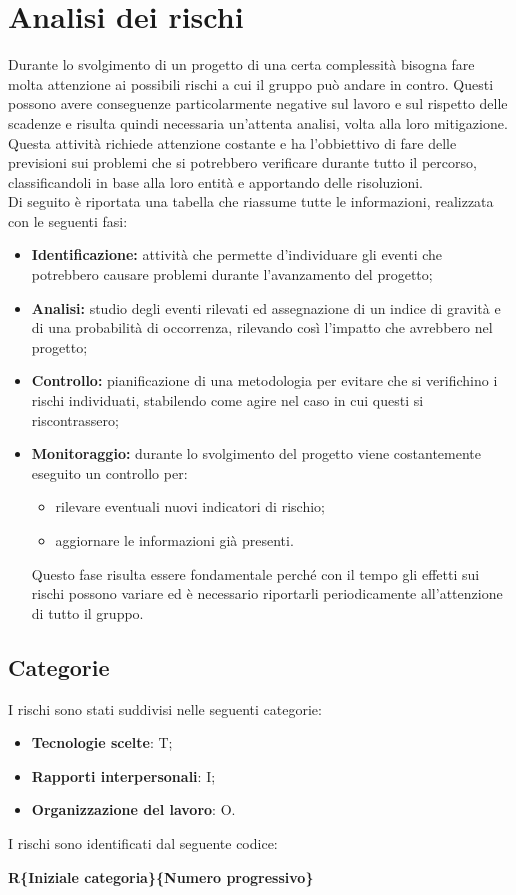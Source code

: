 \section{Analisi dei rischi}
Durante lo svolgimento di un progetto di una certa complessità bisogna fare molta attenzione ai possibili rischi a cui il gruppo può andare in contro. Questi possono avere conseguenze particolarmente negative sul lavoro e sul rispetto delle scadenze e risulta quindi necessaria un'attenta analisi, volta alla loro mitigazione.\\Questa attività richiede attenzione costante e ha l'obbiettivo di fare delle previsioni sui problemi che si potrebbero verificare durante tutto il percorso, classificandoli in base alla loro entità e apportando delle risoluzioni.\\
Di seguito è riportata una tabella che riassume tutte le informazioni, realizzata con le seguenti fasi:
\begin{itemize}
\item \textbf{Identificazione:} attività che permette d'individuare gli eventi che potrebbero causare problemi durante l'avanzamento del progetto;
\item \textbf{Analisi:} studio degli eventi rilevati ed assegnazione di un indice di gravità e di una probabilità di occorrenza, rilevando così l'impatto che avrebbero nel progetto;
\item \textbf{Controllo:} pianificazione di una metodologia per evitare che
si verifichino i rischi individuati, stabilendo come agire nel caso in cui questi si riscontrassero;
\item \textbf{Monitoraggio:} durante lo svolgimento del progetto viene costantemente eseguito un controllo per:
	\begin{itemize}
		\item rilevare eventuali nuovi indicatori di rischio;
		\item aggiornare le informazioni già presenti.
	\end{itemize}
Questo fase risulta essere fondamentale perché con il tempo gli effetti sui rischi possono variare ed è necessario riportarli periodicamente all'attenzione di tutto il gruppo.
\end{itemize}

\subsection{Categorie}
I rischi sono stati suddivisi nelle seguenti categorie:
\begin{itemize}
\item \textbf{Tecnologie scelte}: T;
\item \textbf{Rapporti interpersonali}: I;
\item \textbf{Organizzazione del lavoro}: O.
\end{itemize}
I rischi sono identificati dal seguente codice:
\begin{center}
	\textbf{R\{Iniziale categoria\}\{Numero progressivo\}}
\end{center}
